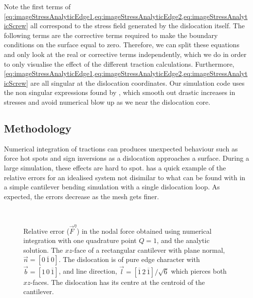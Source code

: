 Note the first terms of \cref{eq:imageStressAnalyticEdge1,eq:imageStressAnalyticEdge2,eq:imageStressAnalyticScrew} all correspond to the stress field generated by the dislocation itself. The following terms are the corrective terms required to make the boundary conditions on the surface equal to zero. Therefore, we can split these equations and only look at the real or corrective terms independently, which we do in order to only visualise the effect of the different traction calculations. Furthermore, \cref{eq:imageStressAnalyticEdge1,eq:imageStressAnalyticEdge2,eq:imageStressAnalyticScrew} are all singular at the dislocation coordinates. Our simulation code uses the non singular expressions found by \citet{a_non-singular_continuum_theory_of_dislocations}, which smooth out drastic increases in stresses and avoid numerical blow up as we near the dislocation core.

\subsection{Methodology}\label{ss:paperMethod}

Numerical integration of tractions can produces unexpected behaviour such as force hot spots and sign inversions as a dislocation approaches a surface. During a large simulation, these effects are hard to spot.  has a quick example of the relative errors for an idealised system not disimilar to what can be found with in a simple cantilever bending simulation with a single dislocation loop. As expected, the errors decrease as the mesh gets finer.
\begin{figure}
    \centering
    ~
    \caption[Relative error comparison of analytic v.s. numeric tractions on a surface as a function of mesh coarseness.]{Relative error ($\vec{F}^{\eta}$) in the nodal force obtained using numerical integration with one quadrature point $Q = 1$, and the analytic solution. The $xz$-face of a rectangular cantilever with plane normal, $\vec{n} = \left[0\,\overline{1}\,0\right]$. The dislocation is of pure edge character with $\vec{b} = [1\,0\,\overline{1}]$, and line direction, $\vec{l} = \left[\overline{1}\,2\,\overline{1}\right]/\sqrt{6}$ which pierces both $xz$-faces. The dislocation has its centre at the centroid of the cantilever.}
    \label{f:err_basic_cantilever}
\end{figure}

